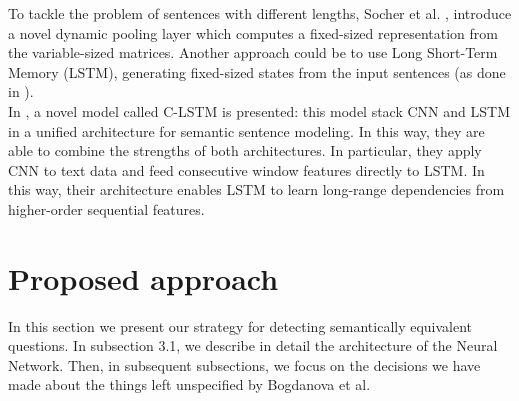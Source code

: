\documentclass[10pt,twocolumn,letterpaper]{article}
\begin{document}
To tackle the problem of sentences with different lengths, Socher et al. \cite{socher2011dynamic}, introduce a novel dynamic pooling layer which computes a fixed-sized representation from the variable-sized matrices. Another approach could be to use Long Short-Term Memory (LSTM), generating fixed-sized states from the input sentences (as done in \cite{tai2015improved}).\\
In \cite{zhou2015c}, a novel model called C-LSTM is presented: this model stack CNN and LSTM in a unified architecture for semantic sentence modeling. In this way, they are able to combine the strengths of both architectures. In particular, they apply CNN to text data and feed consecutive window features directly to LSTM. In this way, their architecture enables LSTM to learn long-range dependencies from higher-order sequential features.
\section{Proposed approach}
In this section we present our strategy for detecting semantically equivalent questions. In subsection 3.1, we describe in detail the architecture of the Neural Network. Then, in subsequent subsections, we focus on the decisions we have made about the things left unspecified by Bogdanova et al.
\end{document}
